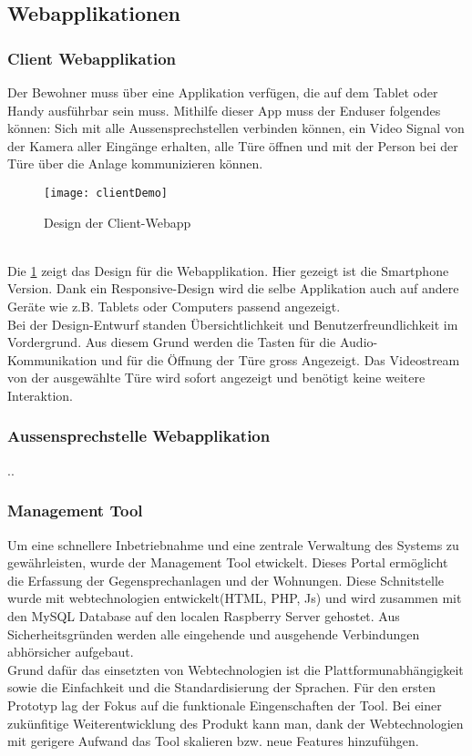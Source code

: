 \subsection{Webapplikationen}
\label{kap:webapp}


\subsubsection{Client Webapplikation}
Der Bewohner muss über eine Applikation verfügen, die auf dem Tablet oder Handy ausführbar sein muss. Mithilfe dieser App muss der Enduser folgendes können: Sich mit alle Aussensprechstellen verbinden können, ein Video Signal von der Kamera aller Eingänge erhalten, alle Türe öffnen und mit der Person bei der Türe über die Anlage kommunizieren können.
\\
\begin{figure}[htb!]
	\begin{center}
		\texttt{[image: clientDemo]}
		\caption[Design der Client-Webapp]{Design der Client-Webapp}
		\label{fig:clientDemo}
	\end{center}
\end{figure}
\\
Die \cref{fig:clientDemo} zeigt das Design für die Webapplikation. Hier gezeigt ist die Smartphone Version. Dank ein Responsive-Design wird die selbe Applikation auch auf andere Geräte wie z.B. Tablets oder Computers passend angezeigt.
\\ 
Bei der Design-Entwurf standen Übersichtlichkeit und Benutzerfreundlichkeit im Vordergrund. Aus diesem Grund werden die Tasten für die Audio-Kommunikation und für die Öffnung der Türe gross Angezeigt. Das Videostream von der ausgewählte Türe wird sofort angezeigt und benötigt keine weitere Interaktion. 

\subsubsection{Aussensprechstelle Webapplikation}
..

\subsubsection{Management Tool}
\label{kap:managementtool}
Um eine schnellere Inbetriebnahme und eine zentrale Verwaltung des Systems zu gewährleisten, wurde der Management Tool etwickelt. Dieses Portal ermöglicht die Erfassung der Gegensprechanlagen und der Wohnungen.
Diese Schnitstelle wurde mit webtechnologien entwickelt(HTML, PHP, Js) und wird zusammen mit den MySQL Database auf den localen Raspberry Server gehostet. Aus Sicherheitsgründen werden alle eingehende und ausgehende Verbindungen abhörsicher aufgebaut.
\\
Grund dafür das einsetzten von Webtechnologien ist die Plattformunabhängigkeit sowie die Einfachkeit und die Standardisierung der Sprachen. Für den ersten Prototyp lag der Fokus auf die funktionale Eingenschaften der Tool. Bei einer zukünfitige Weiterentwicklung des Produkt kann man, dank der Webtechnologien mit gerigere Aufwand das Tool skalieren bzw. neue Features hinzufühgen.  


